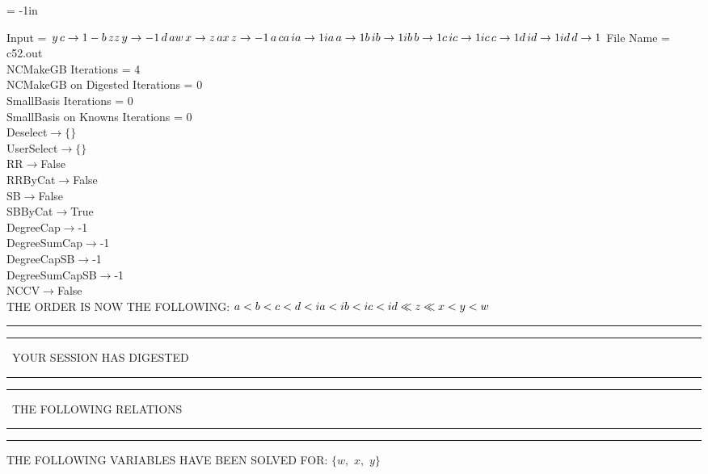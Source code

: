 \voffset = -1in
\evensidemargin 0.1in
\oddsidemargin 0.1in
\textheight 9in
\textwidth 6in

\normalsize
\baselineskip=12pt
\noindent
Input = 
$
\\y\,
 c\rightarrow 1 - b\,
 z\\
z\,
 y\rightarrow -1\,
 d\,
 a\\
w\,
 x\rightarrow z\,
 a\\
x\,
 z\rightarrow -1\,
 a\,
 c\\
a\,
 ia\rightarrow 1\\
ia\,
 a\rightarrow 1\\
b\,
 ib\rightarrow 1\\
ib\,
 b\rightarrow 1\\
c\,
 ic\rightarrow 1\\
ic\,
 c\rightarrow 1\\
d\,
 id\rightarrow 1\\
id\,
 d\rightarrow 1\\
$
File Name = c52.out\\
NCMakeGB Iterations = 4\\
NCMakeGB on Digested Iterations = 0\\
SmallBasis Iterations = 0\\
SmallBasis on Knowns Iterations = 0\\
Deselect$\rightarrow \{\}$\\
UserSelect$\rightarrow \{\}$\\
RR$\rightarrow $False\\
RRByCat$\rightarrow $False\\
SB$\rightarrow $False\\
SBByCat$\rightarrow $True\\
DegreeCap$\rightarrow $-1\\
DegreeSumCap$\rightarrow $-1\\
DegreeCapSB$\rightarrow $-1\\
DegreeSumCapSB$\rightarrow $-1\\
NCCV$\rightarrow $False\\
THE ORDER IS NOW THE FOLLOWING:\hfil\break
$
a<b<c<d<ia<ib<ic<id\ll
z\ll
x<y<w\\
$
\rule[2pt]{6in}{4pt}\hfil\break
\rule[2pt]{1.879in}{4pt}
\ YOUR SESSION HAS DIGESTED\ 
\rule[2pt]{1.879in}{4pt}\hfil\break
\rule[2pt]{1.923in}{4pt}
\ THE FOLLOWING RELATIONS\ 
\rule[2pt]{1.923in}{4pt}\hfil\break
\rule[2pt]{6in}{4pt}\hfil\break
THE FOLLOWING VARIABLES HAVE BEEN SOLVED FOR:\hfil\break
$\{w,
$ $
x,
$ $
y\}$
